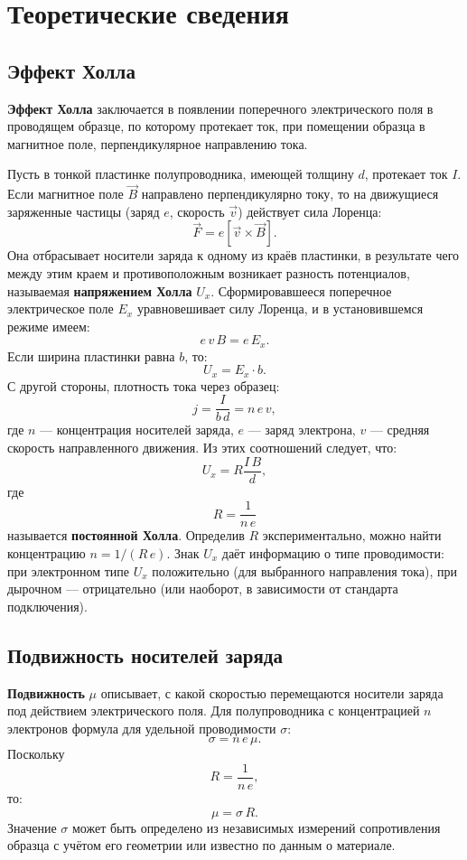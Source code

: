 \documentclass[12pt,a4paper]{article}
\begin{document}
\section{Теоретические сведения}

\subsection{Эффект Холла}

\textbf{Эффект Холла} заключается в появлении поперечного электрического поля в проводящем образце, по которому протекает ток, при помещении образца в магнитное поле, перпендикулярное направлению тока.

Пусть в тонкой пластинке полупроводника, имеющей толщину $d$, протекает ток $I$. Если магнитное поле $\vec{B}$ направлено перпендикулярно току, то на движущиеся заряженные частицы (заряд $e$, скорость $\vec{v}$) действует сила Лоренца:
\[
    \vec{F} = e \left[\vec{v} \times \vec{B}\right].
\]
Она отбрасывает носители заряда к одному из краёв пластинки, в результате чего между этим краем и противоположным возникает разность потенциалов, называемая \textbf{напряжением Холла} $U_x$. Сформировавшееся поперечное электрическое поле $E_x$ уравновешивает силу Лоренца, и в установившемся режиме имеем:
\[
    e\,v\,B = e\,E_x.
\]
Если ширина пластинки равна $b$, то:
\[
    U_x = E_x \cdot b.
\]
С другой стороны, плотность тока через образец:
\[
    j = \frac{I}{b\,d} = n\,e\,v,
\]
где $n$ --- концентрация носителей заряда, $e$ --- заряд электрона, $v$ --- средняя скорость направленного движения. Из этих соотношений следует, что:
\[
    U_x = R \frac{I\,B}{d},
\]
где
\[
    R = \frac{1}{n\,e} 
\]
называется \textbf{постоянной Холла}. Определив $R$ экспериментально, можно найти концентрацию $n = 1/(R\,e)$. Знак $U_x$ даёт информацию о типе проводимости: при электронном типе $U_x$ положительно (для выбранного направления тока), при дырочном --- отрицательно (или наоборот, в зависимости от стандарта подключения).

\subsection{Подвижность носителей заряда}

\textbf{Подвижность} $\mu$ описывает, с какой скоростью перемещаются носители заряда под действием электрического поля. Для полупроводника с концентрацией $n$ электронов формула для удельной проводимости $\sigma$:
\[
    \sigma = n\,e\,\mu.
\]
Поскольку 
\[
    R = \frac{1}{n\,e},
\]
то:
\[
    \mu = \sigma \, R.
\]
Значение $\sigma$ может быть определено из независимых измерений сопротивления образца с учётом его геометрии или известно по данным о материале.
\end{document}

